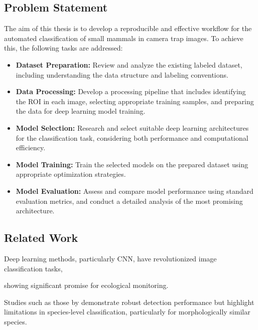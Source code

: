 \subsection{Problem Statement}

The aim of this thesis is to develop a reproducible and effective workflow for the automated classification of small mammals in camera trap images. To achieve this, the following tasks are addressed:

\begin{itemize}
    \item \textbf{Dataset Preparation:} Review and analyze the existing labeled dataset, including understanding the data structure and labeling conventions.
    
    \item \textbf{Data Processing:} Develop a processing pipeline that includes identifying the \ac{ROI} in each image, selecting appropriate training samples, and preparing the data for deep learning model training.
    
    \item \textbf{Model Selection:} Research and select suitable deep learning architectures for the classification task, considering both performance and computational efficiency.
    
    \item \textbf{Model Training:} Train the selected models on the prepared dataset using appropriate optimization strategies.
    
    \item \textbf{Model Evaluation:} Assess and compare model performance using standard evaluation metrics, and conduct a detailed analysis of the most promising architecture.
\end{itemize}


\subsection{Related Work}

Deep learning methods, particularly \ac{CNN}, have revolutionized image classification tasks,

 showing significant promise for ecological monitoring.

Studies such as those by \textcite{velezChoosingAppropriatePlatform2022,schneiderRecognitionEuropeanMammals2024} demonstrate robust detection performance but highlight limitations in species-level classification, particularly for morphologically similar species.

